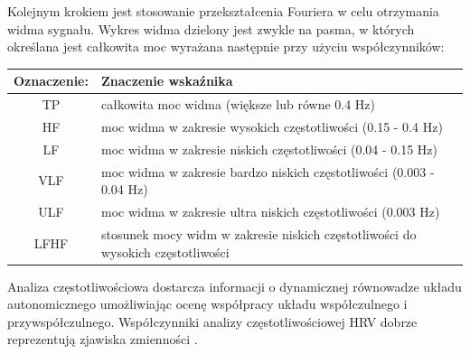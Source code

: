\documentclass[a4paper, 11pt]{article}
\begin{document}
Kolejnym krokiem jest stosowanie przekształcenia Fouriera w celu otrzymania widma sygnału. Wykres widma dzielony jest zwykle na pasma, w których określana jest całkowita moc wyrażana następnie przy użyciu współczynników:
\newline
\begin{tabular}{|c|p{14cm}|}
\hline
Oznaczenie: & Znaczenie wskaźnika \\ \hline
TP & całkowita moc widma (większe lub równe 0.4 Hz)  \\ \hline
HF & moc widma w zakresie wysokich częstotliwości (0.15 - 0.4 Hz) \\ \hline
LF & moc widma w zakresie niskich częstotliwości (0.04 - 0.15 Hz) \\ \hline
VLF & moc widma w zakresie bardzo niskich częstotliwości (0.003 - 0.04 Hz)  \\ \hline
ULF & moc widma w zakresie ultra niskich częstotliwości (0.003 Hz)  \\ \hline
LFHF & stosunek mocy widm w zakresie niskich częstotliwości do wysokich częstotliwości  \\
\hline
\end{tabular}


Analiza częstotliwościowa dostarcza informacji o dynamicznej równowadze układu autonomicznego umożliwiając ocenę współpracy układu współczulnego i przywspółczulnego. Współczynniki analizy częstotliwościowej HRV dobrze reprezentują zjawiska zmienności \cite{AUGUST1}.
\end{document}
